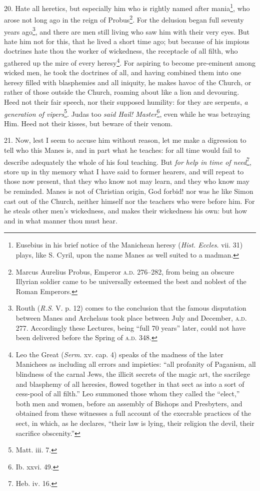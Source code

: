 20. Hate all heretics, but especially him who is rightly named after mania\footnote{Eusebius in his brief notice of the Manichean heresy (\emph{Hist. Eccles}. vii. 31) plays, like S. Cyril, upon the name Manes as well suited to a madman.}, who arose not long ago in the reign of Probus\footnote{Marcus Aurelius Probus, Emperor \textsc{a.d.} 276–282, from being an obscure Illyrian soldier came to be universally esteemed the best and noblest of the Roman Emperors.}. For the delusion began full seventy years ago\footnote{Routh (\emph{\textsc{R.S}}\textsc{. V.} p. 12) comes to the conclusion that the famous disputation between Manes and Archelaus took place between July and December, \textsc{a.d.} 277. Accordingly these Lectures, being “full 70 years” later, could not have been delivered before the Spring of \textsc{a.d.} 348.}, and there are men still living who saw him with their very eyes. But hate him not for this, that he lived a short time ago; but because of his impious doctrines hate thou the worker of wickedness, the receptacle of all filth, who gathered up the mire of every heresy\footnote{Leo the Great (\emph{Serm}. xv. cap. 4) speaks of the madness of the later Manichees as including all errors and impieties: “all profanity of Paganism, all blindness of the carnal Jews, the illicit secrets of the magic art, the sacrilege and blasphemy of all heresies, flowed together in that sect as into a sort of cess-pool of all filth.” Leo summoned those whom they called the “elect,” both men and women, before an assembly of Bishops and Presbyters, and obtained from these witnesses a full account of the execrable practices of the sect, in which, as he declares, “their law is lying, their religion the devil, their sacrifice obscenity.”}. For aspiring to become pre-eminent among wicked men, he took the doctrines of all, and having combined them into one heresy filled with blasphemies and all iniquity, he makes havoc of the Church, or rather of those outside the Church, roaming about like a lion and devouring. Heed not their fair speech, nor their supposed humility: for they are serpents, \emph{a generation of vipers}\footnote{Matt. iii. 7.}. Judas too \emph{said Hail! Master}\footnote{Ib. xxvi. 49.}, even while he was betraying Him. Heed not their kisses, but beware of their venom.

21. Now, lest I seem to accuse him without reason, let me make a digression to tell who this Manes is, and in part what he teaches: for all time would fail to describe adequately the whole of his foul teaching. But \emph{for help in time of need}\footnote{Heb. iv. 16.}, store up in thy memory what I have said to former hearers, and will repeat to those now present, that they who know not may learn, and they who know may be reminded. Manes is not of Christian origin, God forbid! nor was he like Simon cast out of the Church, neither himself nor the teachers who were before him. For he steals other men’s wickedness, and makes their wickedness his own: but how and in what manner thou must hear.

